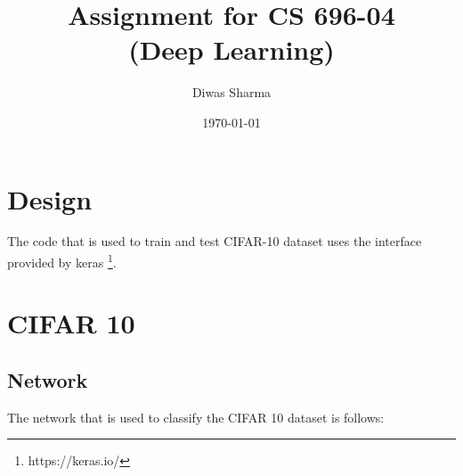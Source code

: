 \documentclass{article}
\title{Assignment for CS 696-04 \\ (Deep Learning)}
\author{Diwas Sharma}
\date{\today}
\begin{document}
\maketitle
\newpage

\section{Design}
The code that is used to train and test CIFAR-10 dataset uses the interface provided by
keras \footnote{https://keras.io/}.

\section{CIFAR 10}
\subsection{Network}
The network that is used to classify the CIFAR 10 dataset is follows:
\end{document}

